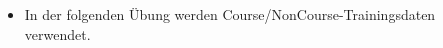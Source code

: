 \begin{frame}[c]
\begin{itemize}
  \item In der folgenden Übung werden Course/NonCourse-Trainingsdaten verwendet.
\end{itemize}
\end{frame}

